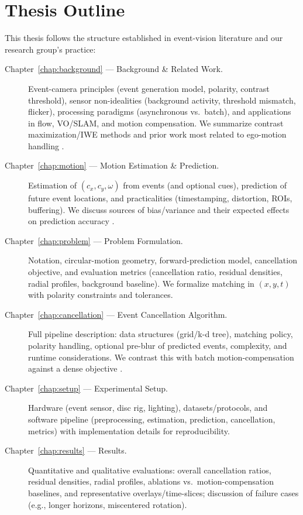 \section{Thesis Outline}
\label{sec:outline}

This thesis follows the structure established in event-vision literature and our research group’s practice:

\begin{description}
    \item[Chapter~\ref{chap:background} --- Background \& Related Work.] Event-camera principles (event generation model, polarity, contrast threshold), sensor non-idealities (background activity, threshold mismatch, flicker), processing paradigms (asynchronous vs.\ batch), and applications in flow, VO/SLAM, and motion compensation. We summarize contrast maximization/IWE methods and prior work most related to ego-motion handling \cite{Gallego2020Survey,Bardow2016SOFIE,Gallego2018CMax}.
    \item[Chapter~\ref{chap:motion} --- Motion Estimation \& Prediction.] Estimation of $(c_x,c_y,\omega)$ from events (and optional cues), prediction of future event locations, and practicalities (timestamping, distortion, ROIs, buffering). We discuss sources of bias/variance and their expected effects on prediction accuracy \cite{Gallego2017Angular}.
    \item[Chapter~\ref{chap:problem} --- Problem Formulation.] Notation, circular-motion geometry, forward-prediction model, cancellation objective, and evaluation metrics (cancellation ratio, residual densities, radial profiles, background baseline). We formalize matching in $(x,y,t)$ with polarity constraints and tolerances.
    \item[Chapter~\ref{chap:cancellation} --- Event Cancellation Algorithm.] Full pipeline description: data structures (grid/k-d tree), matching policy, polarity handling, optional pre-blur of predicted events, complexity, and runtime considerations. We contrast this with batch motion-compensation against a dense objective \cite{Gallego2018CMax}.
    \item[Chapter~\ref{chap:setup} --- Experimental Setup.] Hardware (event sensor, disc rig, lighting), datasets/protocols, and software pipeline (preprocessing, estimation, prediction, cancellation, metrics) with implementation details for reproducibility.
    \item[Chapter~\ref{chap:results} --- Results.] Quantitative and qualitative evaluations: overall cancellation ratios, residual densities, radial profiles, ablations vs.\ motion-compensation baselines, and representative overlays/time-slices; discussion of failure cases (e.g., longer horizons, miscentered rotation).

\end{description}
